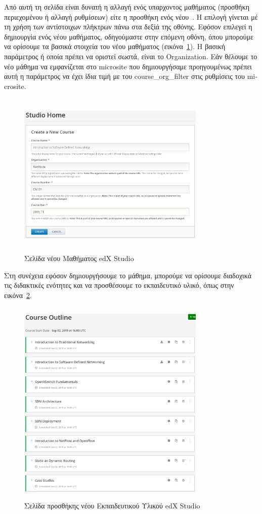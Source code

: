 \documentclass[12pt]{report}
\begin{document}
Από αυτή τη σελίδα είναι δυνατή η αλλαγή ενός υπαρχοντος μαθήματος (προσθήκη περιεχομένου ή αλλαγή ρυθμίσεων) είτε η προσθήκη ενός νέου~\cite{edxdata_package_2}. Η επιλογή γίνεται μέ τη χρήση των αντίστοιχων πλήκτρων πάνω στα δεξίά της οθόνης. Εφόσον επιλεγεί η δημιουργία ενός νέου μαθήματος, οδηγούμαστε στην επόμενη οθόνη, όπου μπορούμε να ορίσουμε τα βασικά στοιχεία του νέου μαθήματος (εικόνα~\ref{fig:edx-studio-new-course}). Η βασική παράμετρος ή οποία πρέπει να οριστεί σωστά, είναι το \textlatin{Organization}. Εάν θέλουμε το νέο μάθημα να εμφανίζεται στο \textlatin{microsite} που δημιουργήσαμε προηγουμένως πρέπει αυτή η παράμετρος να έχει ίδια τιμή με του \textlatin{course\_org\_filter} στις ρυθμίσεις του \textlatin{microsite}.
\begin{figure}[!htbp]
\centering
\includegraphics[width=0.8\textwidth, height=8cm]{edx-studio-new-course}
\caption{Σελίδα νέου Μαθήματος \textlatin{edX Studio}}
\label{fig:edx-studio-new-course}
\end{figure}

Στη συνέχεια εφόσον δημιουργήσουμε το μάθημα, μπορούμε να ορίσουμε διαδοχικά τις διδακτικές ενότητες και να προσθέσουμε το εκπαιδευτικό υλικό, όπως στην εικόνα~\ref{fig:edx-studio-course-outline}.
\begin{figure}[!htbp]
\centering
\includegraphics[width=0.8\textwidth, height=10cm]{edx-studio-course-outline}
\caption{Σελίδα προσθήκης νέου Εκπαιδευτικού Υλικού \textlatin{edX Studio}}
\label{fig:edx-studio-course-outline}
\end{figure}
\end{document}
